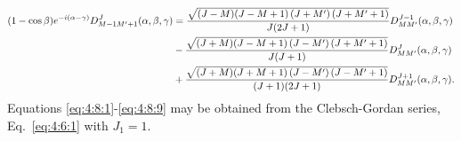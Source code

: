 \begin{align}
(1-\cos \beta) e^{-i(\alpha-\gamma)} D_{M-1 M^{\prime}+1}^{J}(\alpha, \beta, \gamma)&= \frac{\sqrt{(J-M)(J-M+1)\left(J+M^{\prime}\right)\left(J+M^{\prime}+1\right)}}{J(2 J+1)} D_{M M^{\prime}}^{J-1}(\alpha, \beta, \gamma)  \notag\\
&-\frac{\sqrt{(J+M)(J-M+1)\left(J-M^{\prime}\right)\left(J+M^{\prime}+1\right)}}{J(J+1)} D_{M M^{\prime}}^{J}(\alpha, \beta, \gamma)  \notag\\
&+\frac{\sqrt{(J+M)(J+M+1)\left(J-M^{\prime}\right)\left(J-M^{\prime}+1\right)}}{(J+1)(2 J+1)} D_{M M^{\prime}}^{J+1}(\alpha, \beta, \gamma)  .\label{eq:4:8:9}
\end{align}
Equations \eqref{eq:4:8:1}-\eqref{eq:4:8:9} may be obtained from the Clebsch-Gordan series, Eq.~\eqref{eq:4:6:1} with $J_{1}=1$.

